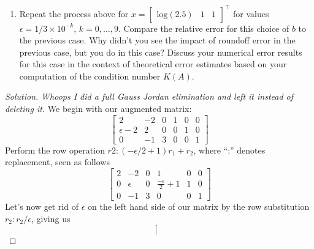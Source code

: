 \documentclass[12pt]{amsart}
\newenvironment{solution}
{\begin{proof}[Solution]}
{\end{proof}}
\begin{document}
\begin{onehalfspace}
\begin{enumerate}[label=(\alph*)]
                  Compare your results based on the Crout algorithm to results obtained using the build in
                  \texttt{lu(A)} function.
            \item Repeat the process above for $x=[\begin{matrix}\text{log}(2.5) & 1 & 1\end{matrix}]^\top$ for values
                  $\epsilon=1/3\times 10^{-k}$, $k=0,\ldots,9$.
                  Compare the relative error for this choice of $b$ to the previous case.
                  Why didn't you see the impact of roundoff error in the previous case, but you do in this case?
                  Discuss your numerical error results for this case in the context of theoretical error estimates
                  based on your computation of the condition number $K(A)$.
        \end{enumerate}
        \begin{solution}
            \emph{Whoops I did a full Gauss Jordan elimination and left it instead of deleting it.}
            We begin with our augmented matrix:
            \begin{displaymath}
                \left[\begin{array}{ccc|ccc}
                          2 & -2 & 0 & 1 & 0 & 0\\
                 \epsilon-2 & 2 & 0 & 0 & 1 & 0\\
                          0 & -1 & 3 & 0 & 0 & 1
                \end{array}\right]
            \end{displaymath}
            Perform the row operation $r2:(-\epsilon/2+1)r_1 + r_2$, where ``:'' denotes replacement, seen as follows
            \begin{displaymath}
                \left[\begin{array}{ccc|ccc}
                          2 & -2 & 0 & 1 & 0 & 0\\
                          0 & \epsilon & 0 & \frac{-\epsilon}{2}+1 & 1 & 0\\
                          0 & -1 & 3 & 0 & 0 & 1
                \end{array}\right]
            \end{displaymath}
            Let's now get rid of $\epsilon$ on the left hand side of our matrix by the row substitution $r_2:r_2/\epsilon$,
            giving us
            \begin{displaymath}
                \left[\begin{array}{ccc|ccc}

\end{array}
\end{displaymath}
\end{solution}
\end{onehalfspace}
\end{document}
